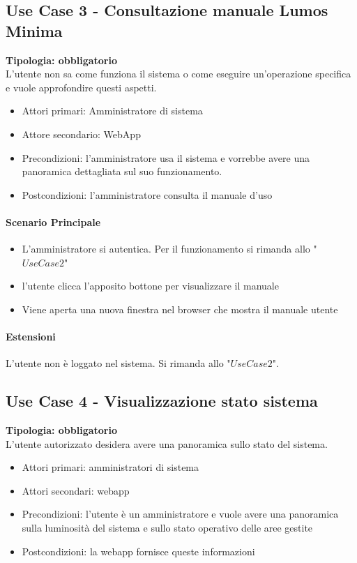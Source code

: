 \documentclass[12pt]{article}
\begin{document}
\subsection{Use Case 3 - Consultazione manuale Lumos Minima}
\textbf{Tipologia: obbligatorio}\\
L'utente non sa come funziona il sistema o come eseguire un'operazione specifica e vuole approfondire questi aspetti.
\begin{itemize}
	\item Attori primari: Amministratore di sistema
	\item Attore secondario: WebApp
	\item Precondizioni: l'amministratore usa il sistema e vorrebbe avere una panoramica dettagliata sul suo funzionamento.
	\item Postcondizioni: l'amministratore consulta il manuale d'uso
\end{itemize}
\paragraph{Scenario Principale}
\begin{itemize}
	\item L'amministratore si autentica. Per il funzionamento si rimanda allo "$Use Case 2$"
	\item l'utente clicca l'apposito bottone per visualizzare il manuale
	\item Viene aperta una nuova finestra nel browser che mostra il manuale utente
\end{itemize}

\paragraph{Estensioni} L'utente non è loggato nel sistema. Si rimanda allo "$Use Case 2$".

\subsection{Use Case 4 - Visualizzazione stato sistema}
\textbf{Tipologia: obbligatorio} \\
L'utente autorizzato desidera avere una panoramica sullo stato del sistema.
\begin{itemize}
	\item Attori primari: amministratori di sistema
	\item Attori secondari: webapp
	\item Precondizioni: l'utente è un amministratore e vuole avere una panoramica sulla luminosità del sistema e sullo stato operativo delle aree gestite
	\item Postcondizioni: la webapp fornisce queste informazioni
\end{itemize}
\end{document}
